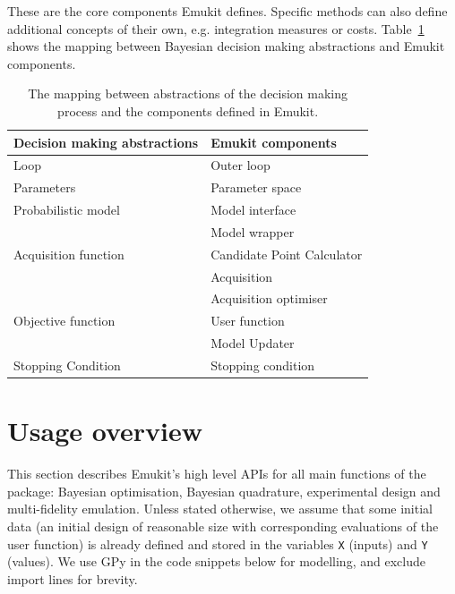 These are the core components Emukit defines. Specific methods can also define additional concepts of their own, e.g. integration measures or costs. Table~\ref{table:abstraction_mapping} shows the mapping between Bayesian decision making abstractions and Emukit components.

\begin{table}
    \setlength{\DUtablewidth}{\tablewidth}
    \begin{longtable}[c]{p{0.4\DUtablewidth}p{0.4\DUtablewidth}}
        \toprule
        \textbf{Decision making abstractions} & \textbf{Emukit components} \\
        \midrule
        \endfirsthead
        Loop & Outer loop \\
        \midrule
        Parameters & Parameter space \\
        Probabilistic model & Model interface \\
        & Model wrapper \\
        \midrule
        Acquisition function & Candidate Point Calculator \\
        & Acquisition \\
        & Acquisition optimiser \\
        \midrule
        Objective function & User function \\
        & Model Updater \\
        \midrule
        Stopping Condition & Stopping condition \\
        \bottomrule
    \end{longtable}
    \caption{The mapping between abstractions of the decision making process and the components defined in Emukit.}
    \label{table:abstraction_mapping}
\end{table}

\section{Usage overview}\label{sec:usage}
This section describes Emukit's high level APIs for all main functions of the package: Bayesian optimisation, Bayesian quadrature, experimental design and multi-fidelity emulation. Unless stated otherwise, we assume that some initial data (an initial design of reasonable size with corresponding evaluations of the user function) is already defined and stored in the variables \texttt{X} (inputs) and \texttt{Y} (values). We use GPy \cite{gpy2014} in the code snippets below for modelling, and exclude import lines for brevity.

